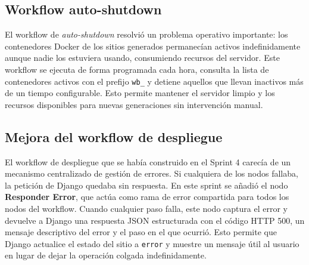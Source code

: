 \subsection{Workflow auto-shutdown}
\label{subsec:workflow-auto-shutdown}

El workflow de \emph{auto-shutdown} resolvió un problema operativo importante: los contenedores Docker de los sitios generados permanecían activos indefinidamente aunque nadie los estuviera usando, consumiendo recursos del servidor. Este workflow se ejecuta de forma programada cada hora, consulta la lista de contenedores activos con el prefijo \texttt{wb\_} y detiene aquellos que llevan inactivos más de un tiempo configurable. Esto permite mantener el servidor limpio y los recursos disponibles para nuevas generaciones sin intervención manual.


\subsection{Mejora del workflow de despliegue}
\label{subsec:mejora-workflow-despliegue}

El workflow de despliegue que se había construido en el Sprint 4 carecía de un mecanismo centralizado de gestión de errores. Si cualquiera de los nodos fallaba, la petición de Django quedaba sin respuesta. En este sprint se añadió el nodo \textbf{Responder Error}, que actúa como rama de error compartida para todos los nodos del workflow. Cuando cualquier paso falla, este nodo captura el error y devuelve a Django una respuesta JSON estructurada con el código HTTP 500, un mensaje descriptivo del error y el paso en el que ocurrió. Esto permite que Django actualice el estado del sitio a \texttt{error} y muestre un mensaje útil al usuario en lugar de dejar la operación colgada indefinidamente.




